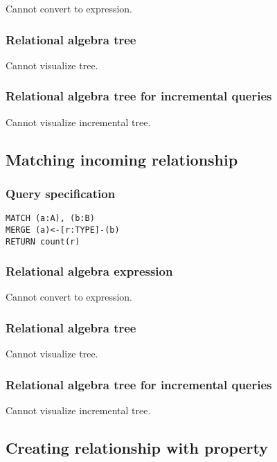 Cannot convert to expression.

\subsubsection*{Relational algebra tree}

Cannot visualize tree.

\subsubsection*{Relational algebra tree for incremental queries}

Cannot visualize incremental tree.

\subsection{Matching incoming relationship}

\subsubsection*{Query specification}

\begin{lstlisting}
MATCH (a:A), (b:B)
MERGE (a)<-[r:TYPE]-(b)
RETURN count(r)
\end{lstlisting}

\subsubsection*{Relational algebra expression}

Cannot convert to expression.

\subsubsection*{Relational algebra tree}

Cannot visualize tree.

\subsubsection*{Relational algebra tree for incremental queries}

Cannot visualize incremental tree.

\subsection{Creating relationship with property}

